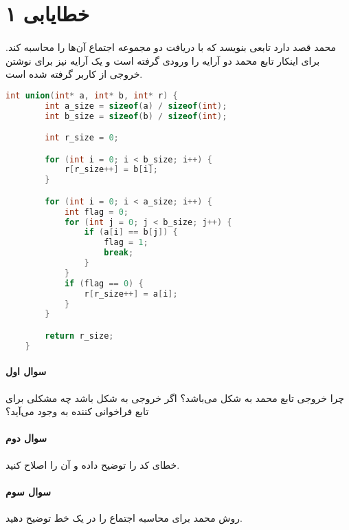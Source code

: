 \documentclass[../main.tex]{subfiles}
\begin{document}
\section{خطایابی ۱}
\paragraph{}
محمد قصد دارد تابعی بنویسد که با دریافت دو مجموعه اجتماع آن‌ها را محاسبه کند.
برای اینکار تابع محمد دو آرایه را ورودی گرفته است
و یک آرایه نیز برای نوشتن خروجی از کاربر گرفته شده است.

\begin{latin}
\begin{lstlisting}[language=c]
    int union(int* a, int* b, int* r) {
        int a_size = sizeof(a) / sizeof(int);
        int b_size = sizeof(b) / sizeof(int);

        int r_size = 0;

        for (int i = 0; i < b_size; i++) {
            r[r_size++] = b[i];
        }

        for (int i = 0; i < a_size; i++) {
            int flag = 0;
            for (int j = 0; j < b_size; j++) {
                if (a[i] == b[j]) {
                    flag = 1;
                    break;
                }
            }
            if (flag == 0) {
                r[r_size++] = a[i];
            }
        }

        return r_size;
    }
\end{lstlisting}
\end{latin}

\paragraph{سوال اول}
چرا خروجی تابع محمد به شکل 
می‌باشد؟ اگر خروجی به شکل  باشد چه مشکلی برای تابع فراخوانی کننده به وجود می‌آید؟

\paragraph{سوال دوم}
خطای کد را توضیح داده و آن را اصلاح کنید.

\paragraph{سوال سوم}
روش محمد برای محاسبه اجتماع را در یک خط توضیح دهید.
\end{document}
